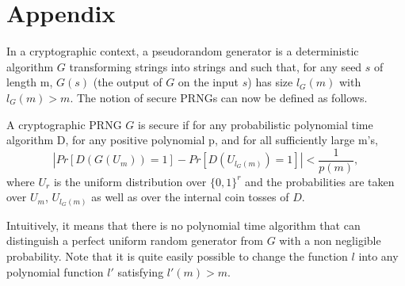 \chapter{Appendix}
In a cryptographic context, a pseudorandom generator is a deterministic algorithm $G$ transforming strings into strings and such that, for any seed 
$s$ of length m, $G(s)$ (the output of $G$ on the input $s$) has size $l_G(m)$ with $l_G(m) > m$. The notion of secure 
PRNGs can now be defined as follows.

\begin{definition}
\label{CSPRNG}
A cryptographic PRNG $G$ is secure if for any probabilistic polynomial time algorithm D, for any positive polynomial p, 
and for all sufficiently large m's,  
\begin{equation}
\left|Pr[D(G(U_m))=1]-Pr[D(U_{l_G(m)})=1]\right|<\frac{1}{p(m)},
\end{equation}
where $U_r$ is the uniform distribution over $\{0, 1\}^r$ and the probabilities are taken over $U_m$, 
$U_{l_G(m)}$ as well as over the internal coin tosses of $D$.
\end{definition}

Intuitively, it means that there is no polynomial time algorithm that can distinguish a perfect uniform 
random generator from $G$ with a non negligible probability. Note that it is quite easily possible to change 
the function $l$ into any polynomial function $l'$ satisfying $l'(m)>m$. 